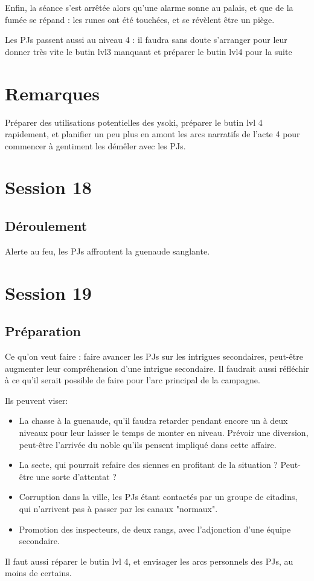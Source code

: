 \documentclass[10pt,a4paper]{book}
\begin{document}
Enfin, la séance s'est arrêtée alors qu'une alarme sonne au palais, et que de la fumée se répand : les runes ont été touchées, et se révèlent être un piège.

Les PJs passent aussi au niveau 4 : il faudra sans doute s'arranger pour leur donner très vite le butin lvl3 manquant et préparer le butin lvl4 pour la suite
\section{Remarques}
Préparer des utilisations potentielles des ysoki, préparer le butin lvl 4 rapidement, et planifier un peu plus en amont les arcs narratifs de l'acte 4 pour commencer à gentiment les démêler avec les PJs.


\section{Session 18}
\subsection{Déroulement}
Alerte au feu, les PJs affrontent la guenaude sanglante.
\section{Session 19}
\subsection{Préparation}
Ce qu'on veut faire : faire avancer les PJs sur les intrigues secondaires, peut-être augmenter leur compréhension d'une intrigue secondaire.
Il faudrait aussi réfléchir à ce qu'il serait possible de faire pour l'arc principal de la campagne.

Ils peuvent viser:
\begin{itemize}
\item La chasse à la guenaude, qu'il faudra retarder pendant encore un à deux niveaux pour leur laisser le temps de monter en niveau. Prévoir une diversion, peut-être l'arrivée du noble qu'ils pensent impliqué dans cette affaire.
\item La secte, qui pourrait refaire des siennes en profitant de la situation ? Peut-être une sorte d'attentat ?
\item Corruption dans la ville, les PJs étant contactés par un groupe de citadins, qui n'arrivent pas à passer par les canaux "normaux".
\item Promotion des inspecteurs, de deux rangs, avec l'adjonction d'une équipe secondaire.
\end{itemize}
Il faut aussi réparer le butin lvl 4, et envisager les arcs personnels des PJs, au moins de certains.
\end{document}
